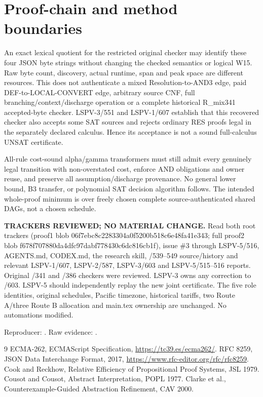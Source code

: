 \documentclass[11pt]{article}
\begin{document}
\section*{Proof-chain and method boundaries}
An exact lexical quotient for the restricted original checker may identify these four JSON byte strings without changing the checked semantics or logical W15. Raw byte count, discovery, actual runtime, span and peak space are different resources. This does not authenticate a mixed Resolution-to-AND3 edge, paid DEF-to-LOCAL-CONVERT edge, arbitrary source CNF, full branching/context/discharge operation or a complete historical R_mix341 accepted-byte checker. LSPV-3/551 and LSPV-1/607 establish that this recovered checker also accepts some SAT sources and rejects ordinary RES proofs legal in the separately declared calculus. Hence its acceptance is not a sound full-calculus UNSAT certificate.

All-rule cost-sound alpha/gamma transformers must still admit every genuinely legal transition with non-overstated cost, enforce AND obligations and owner reuse, and preserve all assumption/discharge provenance. No general lower bound, B3 transfer, or polynomial SAT decision algorithm follows. The intended whole-proof minimum is over freely chosen complete source-authenticated shared DAGs, not a chosen schedule.

\noindent\textbf{TRACKERS REVIEWED; NO MATERIAL CHANGE.}
Read both root trackers (proof1 blob 06f7ebc8c2283304a0f5200b518c6e48fa41e343; full proof2 blob f678f707880da4dfc97dabf778430c6dc816cb1f), issue \#3 through LSPV-5/516, AGENTS.md, CODEX.md, the research skill, /539--549 source/history and relevant LSPV-1/607, LSPV-2/587, LSPV-3/603 and LSPV-5/515--516 reports. Original /341 and /386 checkers were reviewed. LSPV-3 owns any correction to /603. LSPV-5 should independently replay the new joint certificate. The five role identities, original schedules, Pacific timezone, historical tariffs, two Route A/three Route B allocation and main.tex ownership are unchanged. No automations modified.

Reproducer: .
Raw evidence: .

\begin{thebibliography}{9}
 ECMA-262, ECMAScript Specification, \url{https://tc39.es/ecma262/}.
 RFC 8259, JSON Data Interchange Format, 2017, \url{https://www.rfc-editor.org/rfc/rfc8259}.
 Cook and Reckhow, Relative Efficiency of Propositional Proof Systems, JSL 1979.
 Cousot and Cousot, Abstract Interpretation, POPL 1977.
 Clarke et al., Counterexample-Guided Abstraction Refinement, CAV 2000.
\end{thebibliography}
\end{document}
